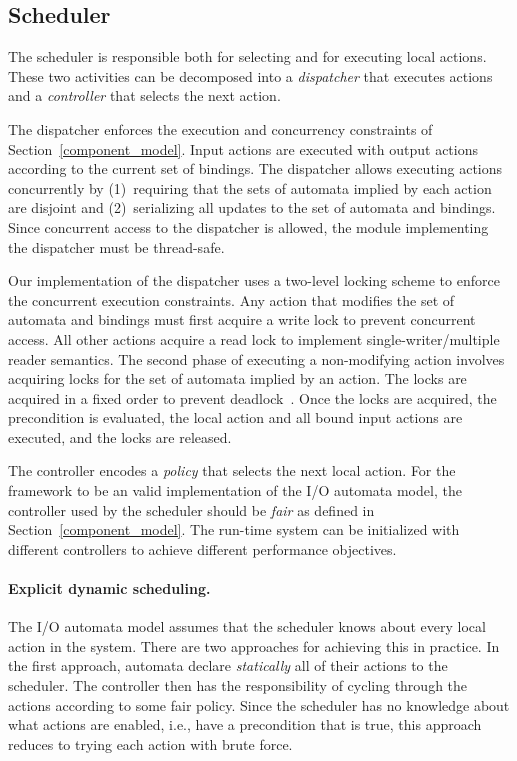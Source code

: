 \subsection{Scheduler\label{scheduling}}

The scheduler is responsible both for selecting and for executing local actions.
These two activities can be decomposed into a \emph{dispatcher} that executes actions and a \emph{controller} that selects the next action.

The dispatcher enforces the execution and concurrency constraints of Section~\ref{component_model}.
Input actions are executed with output actions according to the current set of bindings.
The dispatcher allows executing actions concurrently by (1)~requiring that the sets of automata implied by each action are disjoint and (2)~serializing all updates to the set of automata and bindings.
Since concurrent access to the dispatcher is allowed, the module implementing the dispatcher must be thread-safe.

Our implementation of the dispatcher uses a two-level locking scheme to enforce the concurrent execution constraints.
Any action that modifies the set of automata and bindings must first acquire a write lock to prevent concurrent access.
All other actions acquire a read lock to implement single-writer/multiple reader semantics.
The second phase of executing a non-modifying action involves acquiring locks for the set of automata implied by an action.
The locks are acquired in a fixed order to prevent deadlock~\cite{havender1968avoiding}.
Once the locks are acquired, the precondition is evaluated, the local action and all bound input actions are executed, and the locks are released.

The controller encodes a \emph{policy} that selects the next local action.
For the framework to be an valid implementation of the I/O automata model, the controller used by the scheduler should be \emph{fair} as defined in Section~\ref{component_model}.
The run-time system can be initialized with different controllers to achieve different performance objectives.

\paragraph{Explicit dynamic scheduling.}
The I/O automata model assumes that the scheduler knows about every local action in the system.
There are two approaches for achieving this in practice.
In the first approach, automata declare \emph{statically} all of their actions to the scheduler.
The controller then has the responsibility of cycling through the actions according to some fair policy.
Since the scheduler has no knowledge about what actions are enabled, i.e., have a precondition that is true, this approach reduces to trying each action with brute force.

